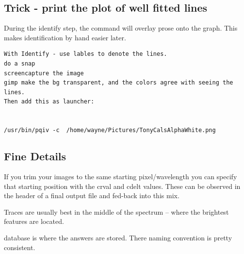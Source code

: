 \subsection{Trick - print the plot of well fitted lines}

During the identify step, the  command will overlay
prose onto the graph. This makes identification by hand easier later. 





\begingroup \fontsize{10pt}{10pt}
\selectfont
\begin{verbatim} 
With Identify - use lables to denote the lines.
do a snap
screencapture the image
gimp make the bg transparent, and the colors agree with seeing the lines.
Then add this as launcher:


/usr/bin/pqiv -c  /home/wayne/Pictures/TonyCalsAlphaWhite.png
\end{verbatim}
\endgroup

\subsection{Fine Details}

If you trim your images to the same starting pixel/wavelength you can specify that starting
position with the crval and cdelt values. These can be observed in the header of a final
output file and fed-back into this mix.

Traces are usually best in the middle of the spectrum -- where the brightest features are
located. 

database is where the answers are stored. There naming convention is pretty consistent.

